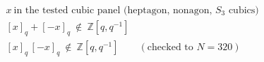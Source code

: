 \documentclass{article}
\begin{document}
\[
\begin{aligned}
&x\ \text{in the tested cubic panel (heptagon, nonagon, }S_3\text{ cubics)}\\
&[x]_q+[-x]_q\ \notin\ \mathbb{Z}[q,q^{-1}]\\
&[x]_q\,[-x]_q\ \notin\ \mathbb{Z}[q,q^{-1}]\qquad(\text{checked to }N=320)
\end{aligned}
\]
\end{document}
